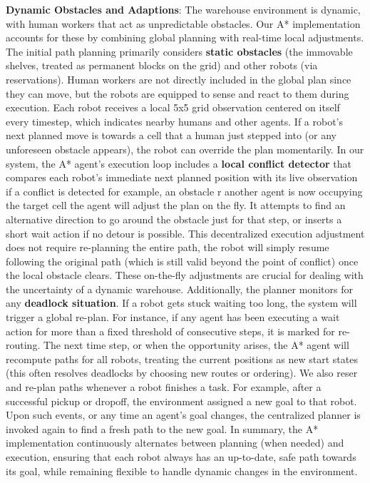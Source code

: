 \documentclass{kththesis}
\begin{document}
\textbf{Dynamic Obstacles and Adaptions}: The warehouse environment is dynamic, with human workers that act as unpredictable obstacles. Our A* implementation accounts for these by combining global planning with real-time local adjustments. The initial path planning primarily considers \textbf{static obstacles} (the immovable shelves, treated as permanent blocks on the grid) and other robots (via reservations). Human workers are not directly included in the global plan since they can move, but the robots are equipped to sense and react to them during execution. Each robot receives a local 5x5 grid observation centered on itself every timestep, which indicates nearby humans and other agents. If a robot's next planned move is towards a cell that a human just stepped into (or any unforeseen obstacle appears), the robot can override the plan momentarily. In our system, the A* agent's execution loop includes a \textbf{local conflict detector} that compares each robot's immediate next planned position with its live observation if a conflict is detected for example, an obstacle r another agent is now occupying the target cell the agent will adjust the plan on the fly. It attempts to find an alternative direction to go around the obstacle just for that step, or inserts a short wait action if no detour is possible. This decentralized execution adjustment does not require re-planning the entire path, the robot will simply resume following the original path (which is still valid beyond the point of conflict) once the local obstacle clears. These on-the-fly adjustments are crucial for dealing with the uncertainty of a dynamic warehouse. Additionally, the planner monitors for any \textbf{deadlock situation}. If a robot gets stuck waiting too long, the system will trigger a global re-plan. For instance, if any agent has been executing a wait action for more than a fixed threshold of consecutive steps, it is marked for re-routing. The next time step, or when the opportunity arises, the A* agent will recompute paths for all robots, treating the current positions as new start states (this often resolves deadlocks by choosing new routes or ordering). We also reser and re-plan paths whenever a robot finishes a task. For example, after a successful pickup or dropoff, the environment assigned a new goal to that robot. Upon such events, or any time an agent's goal changes, the centralized planner is invoked again to find a fresh path to the new goal. In summary, the A* implementation continuously alternates between planning (when needed) and execution, ensuring that each robot always has an up-to-date, safe path towards its goal, while remaining flexible to handle dynamic changes in the environment. 
\end{document}
